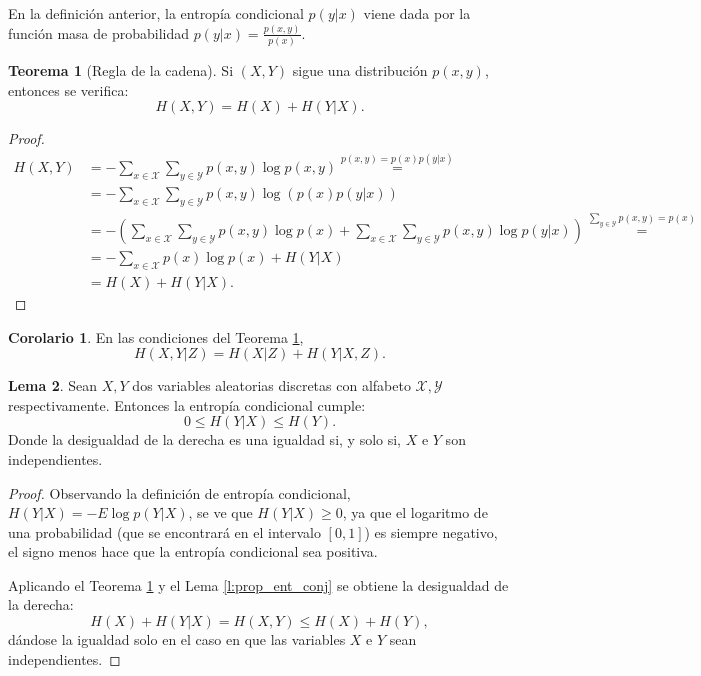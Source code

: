 \documentclass[10pt,a4paper]{article} %
\theoremstyle{definition}
\newtheorem{theorem}{Teorema}[section]
\newtheorem{lemma}[theorem]{Lema}
\newtheorem{corollary}{Corolario}[theorem]
\begin{document}
En la definición anterior, la entropía condicional $p(y|x)$ viene dada por la función masa de probabilidad $p(y|x) = \frac{p(x,y)}{p(x)}$.

\begin{theorem}[Regla de la cadena]\label{t:regla_cadena}
  Si $(X,Y)$ sigue una distribución $p(x,y)$, entonces se verifica:\[
H(X,Y) = H(X) + H(Y|X).
  \]
\end{theorem}

\begin{proof}
  \begin{align*}
    H(X,Y) &= - \sum_{x \in \mathcal{X}} \sum_{y \in \mathcal{Y}} p(x,y) \log p(x,y) \stackrel{p(x,y) = p(x)p(y|x)}{=}\\
    &= - \sum_{x \in \mathcal{X}} \sum_{y \in \mathcal{Y}} p(x,y) \log \left( p(x)p(y|x) \right )\\
    &= - \left(\sum_{x \in \mathcal{X}} \sum_{y \in \mathcal{Y}} p(x,y) \log p(x) + \sum_{x \in \mathcal{X}} \sum_{y \in \mathcal{Y}} p(x,y) \log p(y|x) \right )\stackrel{\sum_{y\in \mathcal{Y}}p(x,y) = p(x)}{=}\\
    &= - \sum_{x \in \mathcal{X}} p(x) \log p(x) + H(Y|X)\\
    &= H(X) + H(Y|X).
  \end{align*}
\end{proof}

\begin{corollary} En las condiciones del Teorema \ref{t:regla_cadena},\[
H(X,Y|Z) = H(X|Z) + H(Y|X, Z).
  \]
\end{corollary}

\begin{lemma}
  Sean $X, Y$ dos variables aleatorias discretas con alfabeto $\mathcal{X}, \mathcal{Y}$ respectivamente. Entonces la entropía condicional cumple:\[
0 \leq H(Y|X) \leq H(Y).
\]
Donde la desigualdad de la derecha es una igualdad si, y solo si, $X$ e $Y$ son independientes.
\end{lemma}

\begin{proof}
  Observando la definición de entropía condicional, $H(Y|X) = - E \log p(Y|X)$, se ve que $H(Y|X) \geq 0$, ya que el logaritmo de una probabilidad (que se encontrará en el intervalo $[0,1]$) es siempre negativo, el signo menos hace que la entropía condicional sea positiva.

  Aplicando el Teorema \ref{t:regla_cadena} y el Lema \ref{l:prop_ent_conj} se obtiene la desigualdad de la derecha:\[
H(X) + H(Y|X) = H(X,Y) \leq H(X) + H(Y),
\]
dándose la igualdad solo en el caso en que las variables $X$ e $Y$ sean independientes.
\end{proof}
\end{document}
